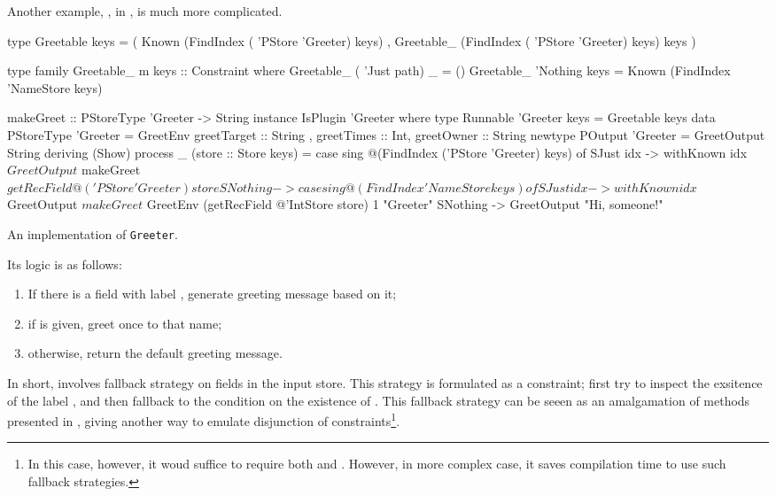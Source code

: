 \documentclass[demotion-paper.tex]{subfiles}
\begin{document}
Another example, , in , is much more complicated.
\begin{listing}[tbp]
\begin{code}
type Greetable keys =
  ( Known (FindIndex ( 'PStore 'Greeter) keys)
  , Greetable_ 
    (FindIndex ( 'PStore 'Greeter) keys) keys
  )

type family Greetable_ m keys :: Constraint where
  Greetable_ ( 'Just path) _ = ()
  Greetable_ 'Nothing keys = 
    Known (FindIndex 'NameStore keys)

makeGreet :: PStoreType 'Greeter -> String
instance IsPlugin 'Greeter where
  type Runnable 'Greeter keys = Greetable keys
  data PStoreType 'Greeter = GreetEnv
    { greetTarget :: String
    , greetTimes :: Int, greetOwner :: String }
  newtype POutput 'Greeter = 
    GreetOutput String deriving (Show)
  process _ (store :: Store keys) =
    case sing
        @(FindIndex ('PStore 'Greeter) keys) of
     SJust idx -> withKnown idx $ GreetOutput $
       makeGreet $ getRecField 
         @('PStore 'Greeter) store
     SNothing ->
      case sing @(FindIndex 'NameStore keys) of
       SJust idx -> withKnown idx $ GreetOutput $
         makeGreet $ GreetEnv
          (getRecField @'IntStore store)
          1 "Greeter"
       SNothing -> GreetOutput "Hi, someone!"
\end{code}
\caption{An implementation of \texttt{Greeter}.}
\label{lst:plugin-greet}
\end{listing}
Its logic is as follows:
\begin{enumerate}
  \item If there is a field with label , generate greeting message based on it;
  \item if  is given, greet once to that name;
  \item otherwise, return the default greeting message.
\end{enumerate}
In short,  involves fallback strategy on fields in the input store.
This strategy is formulated as a  constraint; first try to inspect the exsitence of the label , and then fallback to the condition on the existence of .
This fallback strategy can be seeen as an amalgamation of methods presented in , giving another way to emulate disjunction of constraints\footnote{%
In this case, however, it woud suffice to require both  and . However, in more complex case, it saves compilation time to use such fallback strategies.}.
\end{document}
